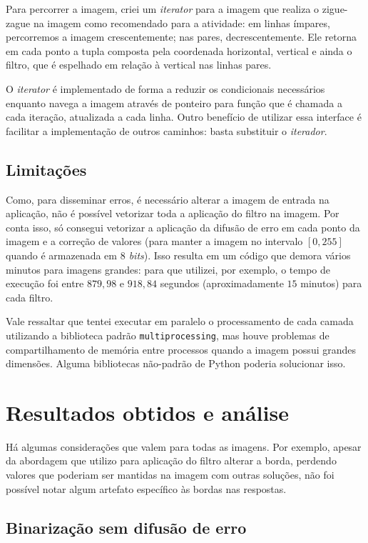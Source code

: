 \documentclass[brazilian,a4paper,twocolumn]{article}
\begin{document}
        Para percorrer a imagem, criei um \textit{iterator} para a imagem que realiza o zigue-zague na imagem como recomendado para a atividade: em linhas ímpares, percorremos a imagem crescentemente; nas pares, decrescentemente. Ele retorna em cada ponto a tupla composta pela coordenada horizontal, vertical e ainda o filtro, que é espelhado em relação à vertical nas linhas pares.

        O \textit{iterator} é implementado de forma a reduzir os condicionais necessários enquanto navega a imagem através de ponteiro para função que é chamada a cada iteração, atualizada a cada linha. Outro benefício de utilizar essa interface é facilitar a implementação de outros caminhos: basta substituir o \textit{iterador}.

    \subsection{Limitações}

        Como, para disseminar erros, é necessário alterar a imagem de entrada na aplicação, não é possível vetorizar toda a aplicação do filtro na imagem. Por conta isso, só consegui vetorizar a aplicação da difusão de erro em cada ponto da imagem e a correção de valores (para manter a imagem no intervalo $[0, 255]$ quando é armazenada em \textit{$8$ bits}). Isso resulta em um código que demora vários minutos para imagens grandes: para que utilizei, por exemplo, o tempo de execução foi entre $879,98$ e $918,84$ segundos (aproximadamente $15$ minutos) para cada filtro.

        Vale ressaltar que tentei executar em paralelo o processamento de cada camada utilizando a biblioteca padrão \texttt{multiprocessing}, mas houve problemas de compartilhamento de memória entre processos quando a imagem possui grandes dimensões. Alguma bibliotecas não-padrão de Python poderia solucionar isso.


\section{Resultados obtidos e análise}

    Há algumas considerações que valem para todas as imagens. Por exemplo, apesar da abordagem que utilizo para aplicação do filtro alterar a borda, perdendo valores que poderiam ser mantidas na imagem com outras soluções, não foi possível notar algum artefato específico às bordas nas respostas.


    \subsection{Binarização sem difusão de erro}
\end{document}

